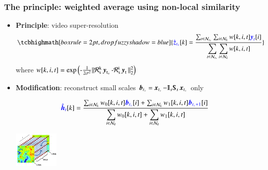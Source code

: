 \documentclass{beamer}
\let\olditem\item
\renewcommand{\item}{\setlength{\itemsep}{\fill}\olditem}
\begin{document}
\begin{frame}
\frametitle{The principle: weighted average using non-local similarity}
	\begin{itemize}\itemsep0em
		\item \textbf{Principle}: video super-resolution {\footnotesize \cite{protter2009generalizing}}
		\begin{equation*}
			\tcbhighmath[boxrule=2pt,drop fuzzy shadow=blue]{\textcolor{blue}{\hat{\mybold{z}}_{t_\knot}}[k]=\frac{\sum_{t\in\neighbor_{t_\knot}}\sum_{i\in\neighbor_k}w[k,i,t]\textcolor{blue}{\mybold{y}_t}[i]}{\displaystyle \sum_{t\in\neighbor_{t_\knot}}\sum_{i\in\neighbor_k}w[k,i,t]}}
		\end{equation*}
		where $ w[k,i,t] = \operatorname{\exp{ \left( -\frac{1}{2\sigma^2} \Vert \mathcal{R}_s^k\ensuremath{\operatorname{\boldsymbol{y}}}_{t_{\circ}}-\mathcal{R}_s^i\ensuremath{\operatorname{\boldsymbol{y}}}_t \Vert^2_2\right)}} $
		\vspace{0.2cm}
		\item \textbf{Modification}: reconstruct small scales $ \boundHF_{t_\knot} = \mybold{x}_{t_\knot} - \Interp_s\Sub_s\mybold{x}_{t_\knot} $ only
		\begin{minipage}{\textwidth}
			\begin{minipage}{0.7\textwidth}
				\begin{equation*}
					\textcolor{blue}{\hat{\operatorname{\boldsymbol{h}}}_t}[k]=\frac{\sum_{i\in\mathcal{N}_k}w_0[k,i,t]\textcolor{blue}{\operatorname{\boldsymbol{b}}_{t_{\circ}}}[i] + \sum_{i\in\mathcal{N}_k}w_1[k,i,t]\textcolor{blue}{\operatorname{\boldsymbol{b}}_{t_{\circ}+1}}[i]}{\displaystyle\sum_{i\in\mathcal{N}_k}w_0[k,i,t] + \sum_{i\in\mathcal{N}_k}w_1[k,i,t]}
				\end{equation*}
			\end{minipage}
			\hfill
			\begin{minipage}{0.25\textwidth}
				\includegraphics[height=1.75cm]{./figures/experimentalsetup/experiment_setup_fusion.png}
			\end{minipage}			
		\end{minipage}		
	\end{itemize}
\end{frame}
\end{document}

